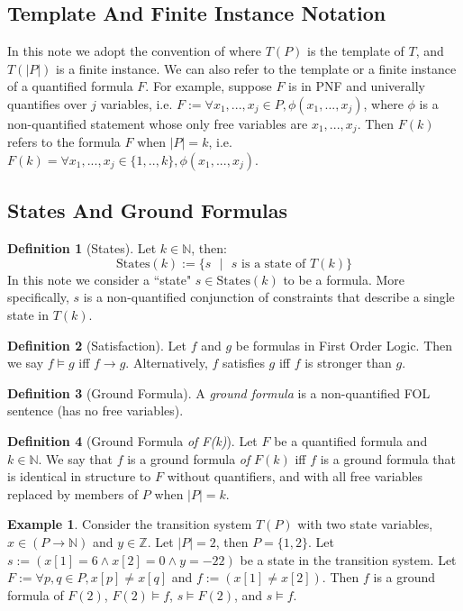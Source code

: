 \documentclass[12pt]{article}
\theoremstyle{definition}
\newtheorem{definition}{Definition}
\newtheorem{example}{Example}
\theoremstyle{remark}
\newcommand{\st}{\text{ }|\text{ }}
\newcommand{\states}{\text{States}}
\begin{document}
\subsection{Template And Finite Instance Notation}
In this note we adopt the convention of \cite{goel2021symmetry} where $T(P)$ is the template of $T$, and $T(|P|)$ is a finite instance.  We can also refer to the template or a finite instance of a quantified formula $F$.  For example, suppose $F$ is in PNF and univerally quantifies over $j$ variables, i.e. $F := \forall x_1,...,x_j \in P, \phi(x_1,...,x_j)$, where $\phi$ is a non-quantified statement whose only free variables are $x_1,...,x_j$.  Then $F(k)$ refers to the formula $F$ when $|P|=k$, i.e. $F(k) = \forall x_1,...,x_j \in \{1,..,k\}, \phi(x_1,...,x_j)$.

\subsection{States And Ground Formulas}
\begin{definition}[States]
  Let $k \in \mathbb{N}$, then:
  $$\states(k) := \{s \st s \text{ is a state of } T(k)\}$$
  In this note we consider a ``state" $s \in \states(k)$ to be a formula.  More specifically, $s$ is a non-quantified conjunction of constraints that describe a single state in $T(k)$.
\end{definition}

\begin{definition}[Satisfaction]
  Let $f$ and $g$ be formulas in First Order Logic.  Then we say $f \models g$ iff $f \rightarrow g$.  Alternatively, $f$ satisfies $g$ iff $f$ is stronger than $g$.
\end{definition}

\begin{definition}[Ground Formula]
  A \textit{ground formula} is a non-quantified FOL sentence (has no free variables).
\end{definition}

\begin{definition}[Ground Formula \textit{of F(k)}]
  Let $F$ be a quantified formula and $k \in \mathbb{N}$.  We say that $f$ is a ground formula \textit{of} $F(k)$ iff $f$ is a ground formula that is identical in structure to $F$ without quantifiers, and with all free variables replaced by members of $P$ when $|P|=k$.
\end{definition}

\begin{example}
  Consider the transition system $T(P)$ with two state variables, $x \in (P \to \mathbb{N})$ and $y \in \mathbb{Z}$.  Let $|P|=2$, then $P=\{1,2\}$.  Let $s := (x[1]=6 \land x[2]=0 \land y=-22)$ be a state in the transition system.  Let $F := \forall p,q \in P, x[p] \neq x[q]$ and $f := (x[1] \neq x[2])$.  Then $f$ is a ground formula of $F(2)$, $F(2) \models f$, $s \models F(2)$, and $s \models f$.
\end{example}
\end{document}
